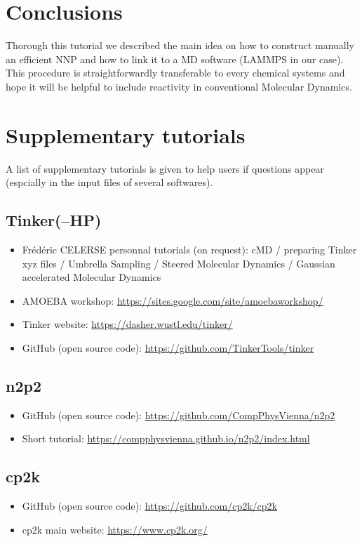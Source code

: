 \documentclass[12pt]{article}
\begin{document}
\section{Conclusions}
Thorough this tutorial we described the main idea on how to construct manually an efficient NNP and how to link it to a MD software (LAMMPS in our case). This procedure is straightforwardly transferable to every chemical systems and hope it will be helpful to include reactivity in conventional Molecular Dynamics.  
%
\section{Supplementary tutorials}
\label{sec:tutorials}
A list of supplementary tutorials is given to help users if questions appear (espcially in the input files of several softwares).
\subsection{Tinker(--HP)}
\begin{itemize}
    \item Frédéric CELERSE personnal tutorials (on request): cMD / preparing Tinker xyz files / Umbrella Sampling / Steered Molecular Dynamics / Gaussian accelerated Molecular Dynamics
    \item AMOEBA workshop: \url{https://sites.google.com/site/amoebaworkshop/}
    \item Tinker website: \url{https://dasher.wustl.edu/tinker/}
    \item GitHub (open source code): \url{https://github.com/TinkerTools/tinker}
\end{itemize}
\subsection{n2p2}
\begin{itemize}
    \item GitHub (open source code): \url{https://github.com/CompPhysVienna/n2p2}
    \item Short tutorial: \url{https://compphysvienna.github.io/n2p2/index.html}
\end{itemize}
\subsection{cp2k}
\begin{itemize}
    \item GitHub (open source code): \url{https://github.com/cp2k/cp2k}
    \item cp2k main website: \url{https://www.cp2k.org/}
\end{itemize}
\end{document}
